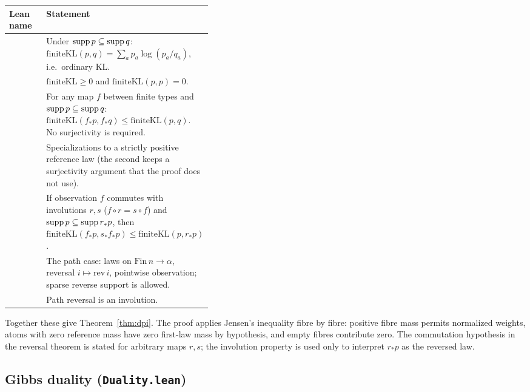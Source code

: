 \begin{center}
\small
\renewcommand{\arraystretch}{1.12}
\begin{tabularx}{\linewidth}{L{0.39\linewidth}Y}
\toprule
Lean name & Statement \\
\midrule
{} & Under \(\operatorname{supp} p\subseteq\operatorname{supp} q\): \(\mathrm{finiteKL}(p,q)=\sum_ap_a\log(p_a/q_a)\), i.e.\ ordinary KL. \\
\newline {} & \(\mathrm{finiteKL}\ge0\) and \(\mathrm{finiteKL}(p,p)=0\). \\
 & For any map \(f\) between finite types and \(\operatorname{supp} p\subseteq\operatorname{supp} q\): \(\mathrm{finiteKL}(f_*p,f_*q)\le\mathrm{finiteKL}(p,q)\). No surjectivity is required. \\
\newline {} & Specializations to a strictly positive reference law (the second keeps a surjectivity argument that the proof does not use). \\
 & If observation \(f\) commutes with involutions \(r,s\) (\(f\circ r=s\circ f\)) and \(\operatorname{supp} p\subseteq\operatorname{supp} r_*p\), then \(\mathrm{finiteKL}(f_*p,s_*f_*p)\le\mathrm{finiteKL}(p,r_*p)\). \\
 & The path case: laws on \(\mathrm{Fin}\,n\to\alpha\), reversal \(i\mapsto\mathrm{rev}\,i\), pointwise observation; sparse reverse support is allowed. \\
 & Path reversal is an involution. \\
\bottomrule
\end{tabularx}
\end{center}

Together these give Theorem~\ref{thm:dpi}. The proof applies Jensen's inequality fibre by fibre: positive fibre mass permits normalized weights, atoms with zero reference mass have zero first-law mass by hypothesis, and empty fibres contribute zero. The commutation hypothesis in the reversal theorem is stated for arbitrary maps \(r,s\); the involution property is used only to interpret \(r_*p\) as the reversed law.

\subsection{Gibbs duality (\texttt{Duality.lean})}

